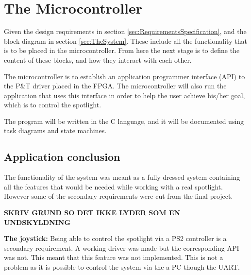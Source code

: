 \section{The Microcontroller}
\label{sec:TheMicrocontroller}

 Given the design requirements in section \ref{sec:RequirementsSpecification}, and the block diagram in section \ref{sec:TheSystem}. These include all the functionality that is to be placed in the microcontroller. From here the next stage is to define the content of these blocks, and how they interact with each other. 
 
 The microcontroller is to establish an application programmer interface (API) to the P\&T driver placed in the FPGA. The microcontroller will also run the application that uses this interface in order to help the user achieve his/her goal, which is to control the spotlight.
 
 The program will be written in the C language, and it will be documented using task diagrams and state machines. 
















\subsection{Application conclusion}

The functionality of the system was meant as a fully dressed system containing all the features that would be needed while working with a real spotlight. However some of the secondary requirements were cut from the final project.

\textbf{SKRIV GRUND SO DET IKKE LYDER SOM EN UNDSKYLDNING}

\textbf{The joystick:} Being able to control the spotlight via a PS2 controller is a secondary requirement. A working driver was made but the corresponding API was not. This meant that this feature was not implemented. This is not a problem as it is possible to control the system via the a PC though the UART.


